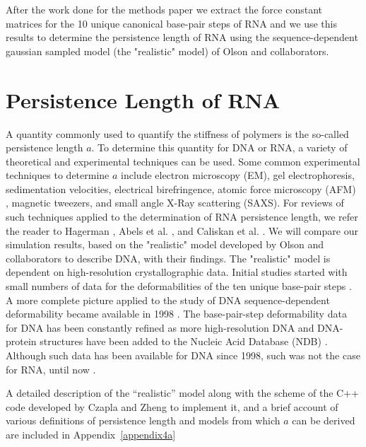After the work done for the methods paper we extract the force
constant matrices for the 10 unique canonical base-pair steps of RNA
and we use this results to determine the persistence length of RNA
using the sequence-dependent gaussian sampled model (the "realistic"
model) of Olson and collaborators.

\section{Persistence Length of RNA}
A quantity commonly used to  quantify the stiffness of polymers is the
so-called persistence  length $a$. To determine this  quantity for DNA
or RNA,  a variety of  theoretical and experimental techniques  can be
used.  Some  common experimental  techniques to determine  $a$ include
electron   microscopy   (EM),   gel   electrophoresis,   sedimentation
velocities, electrical birefringence,  atomic force microscopy (AFM) ,
magnetic  tweezers,  and small  angle  X-Ray  scattering (SAXS).   For
reviews  of  such  techniques  applied  to the  determination  of  RNA
persistence    length,    we   refer    the    reader   to    Hagerman
\cite{hagerman1997}, Abels  et al.  \cite{abels2005},  and Caliskan et
al.   \cite{caliskan2005}.  We  will compare  our  simulation results,
based on  the "realistic" model  developed by Olson  and collaborators
\cite{olson1995} to describe DNA, with their findings. The "realistic"
model is dependent  on high-resolution crystallographic data.  Initial
studies started with small numbers  of data for the deformabilities of
the  ten unique  base-pair  steps \cite{olson1995}.   A more  complete
picture applied  to the study of DNA  sequence-dependent deformability
became  available   in  1998  \cite{olson1998}.    The  base-pair-step
deformability  data  for  DNA  has  been constantly  refined  as  more
high-resolution DNA and DNA-protein  structures have been added to the
Nucleic Acid Database (NDB) \cite{balasubramanian2009}.  Although such
data has been available for DNA  since 1998, such was not the case for
RNA, until now \cite{olson2009}.

A detailed description of the  ``realistic'' model along with the scheme
of the C++  code developed by Czapla and Zheng to  implement it, and a
brief account of various  definitions of persistence length and models
from which $a$ can be derived are included in Appendix~\ref{appendix4a}





